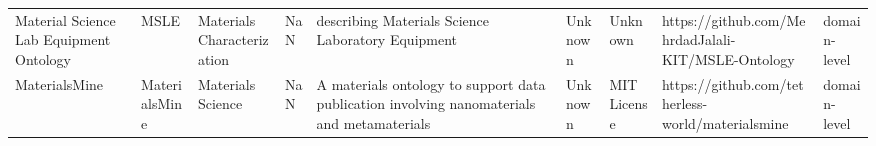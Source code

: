 \begin{tabular}{m{5cm}m{2cm}m{5cm}m{2cm}m{2cm}m{2cm}m{2cm}m{2cm}m{2cm}}
                                          Material Science Lab Equipment Ontology &                    MSLE &                  Materials Characterization &                                                                                                                                                                                                                                                                                                                                                                  NaN &                                                                                                                                                                                                                                                                                                                                                      describing Materials Science Laboratory Equipment &                                                                                                            Unknown &                                      Unknown &                                                 https://github.com/MehrdadJalali-KIT/MSLE-Ontology &      domain-level \\
                                                                    MaterialsMine &           MaterialsMine &                           Materials Science &                                                                                                                                                                                                                                                                                                                                                                  NaN &                                                                                                                                                                                                                                                                                                             A materials ontology to support data publication involving nanomaterials and metamaterials &                                                                                                            Unknown &                                  MIT License &                                                  https://github.com/tetherless-world/materialsmine &      domain-level \\

\end{tabular}
